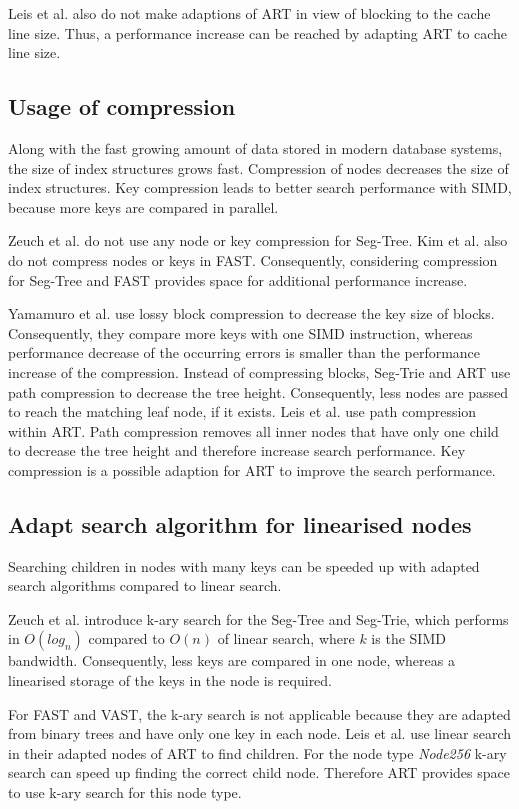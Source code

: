 \documentclass[runningheads,a4paper]{llncs}
\begin{document}
Leis et al. also do not make adaptions of ART in view of blocking to the cache line size. Thus, a performance increase can be reached by adapting ART to cache line size.
\subsection{Usage of compression}
Along with the fast growing amount of data stored in modern database systems, the size of index structures grows fast. Compression of nodes decreases the size of index structures. Key compression leads to better search performance with SIMD, because more keys are compared in parallel.

Zeuch et al. do not use any node or key compression for Seg-Tree. Kim et al. also do not compress nodes or keys in FAST. Consequently, considering compression for Seg-Tree and FAST provides space for additional performance increase.

Yamamuro et al. use lossy block compression to decrease the key size of blocks. Consequently, they compare more keys with one SIMD instruction, whereas performance decrease of the occurring errors is smaller than the performance increase of the compression. Instead of compressing blocks, Seg-Trie and ART use path compression to decrease the tree height. Consequently, less nodes are passed to reach the matching leaf node, if it exists.
Leis et al. use path compression within ART. Path compression removes all inner nodes that have only one child to decrease the tree height and therefore increase search performance. Key compression is a possible adaption for ART to improve the search performance.

\subsection{Adapt search algorithm for linearised nodes}
Searching children in nodes with many keys can be speeded up with adapted search algorithms compared to linear search.

Zeuch et al. introduce k-ary search for the Seg-Tree and Seg-Trie, which performs in $O(log_n)$ compared to $O(n)$ of linear search, where $k$ is the SIMD bandwidth. Consequently, less keys are compared in one node, whereas a linearised storage of the keys in the node is required. 

For FAST and VAST, the k-ary search is not applicable because they are adapted from binary trees and have only one key in each node. Leis et al. use linear search in their adapted nodes of ART to find children. For the node type \emph{Node256} k-ary search can speed up finding the correct child node. Therefore ART provides space to use k-ary search for this node type.
\end{document}
